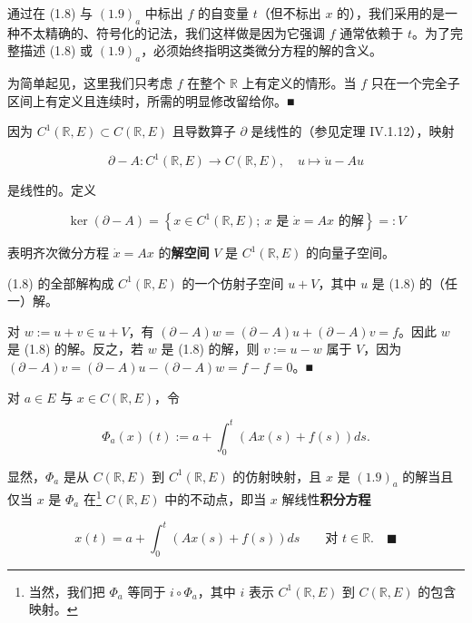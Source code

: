 \begin{remark}

\begin{items}
\item

通过在 (1.8) 与 $ (1.9)_{a} $ 中标出 $ f $ 的自变量 $ t $（但不标出 $ x $ 的），我们采用的是一种不太精确的、符号化的记法，我们这样做是因为它强调 $ f $ 通常依赖于 $ t $。为了完整描述 (1.8) 或 $ (1.9)_{a} $，必须始终指明这类微分方程的解的含义。

\item

为简单起见，这里我们只考虑 $ f $ 在整个 $ \mathbb{R} $ 上有定义的情形。当 $ f $ 只在一个完全子区间上有定义且连续时，所需的明显修改留给你。\nobreak\hspace{0.35em}■

\item

因为 $ C^{1}(\mathbb{R}, E) \subset C(\mathbb{R}, E) $ 且导数算子 $ \partial $ 是线性的（参见定理 IV.1.12），映射

\[
\partial - A : C^{1}(\mathbb{R}, E) \to C(\mathbb{R}, E) , \quad u \mapsto \dot{u} - Au
\]

是线性的。定义

\[
\ker(\partial - A) = \left\{ x \in C^{1}(\mathbb{R}, E) ;\ x \text{ 是 } \dot{x} = Ax \text{ 的解} \right\} =: V
\]

表明齐次微分方程 $ \dot{x} = Ax $ 的\textbf{解空间} $ V $ 是 $ C^{1}(\mathbb{R}, E) $ 的向量子空间。

\item

(1.8) 的全部解构成 $ C^{1}(\mathbb{R}, E) $ 的一个仿射子空间 $ u + V $，其中 $ u $ 是 (1.8) 的（任一）解。

\proofhead
对 $ w := u + v \in u + V $，有 $ (\partial - A)w = (\partial - A)u + (\partial - A)v = f $。因此 $ w $ 是 (1.8) 的解。反之，若 $ w $ 是 (1.8) 的解，则 $ v := u - w $ 属于 $ V $，因为 $ (\partial - A)v = (\partial - A)u - (\partial - A)w = f - f = 0 $。\nobreak\hspace{0.35em}■
\item

对 $ a \in E $ 与 $ x \in C(\mathbb{R}, E) $，令

\[
\Phi_{a}(x)(t) := a + \int_{0}^{t} \left( Ax(s) + f(s) \right)ds .
\]

显然，$ \Phi_{a} $ 是从 $ C(\mathbb{R}, E) $ 到 $ C^{1}(\mathbb{R}, E) $ 的仿射映射，且 $ x $ 是 $ (1.9)_{a} $ 的解当且仅当 $ x $ 是 $ \Phi_{a} $ 在\footnote{当然，我们把 $ \Phi_{a} $ 等同于 $ i \circ \Phi_{a} $，其中 $ i $ 表示 $ C^{1}(\mathbb{R}, E) $ 到 $ C(\mathbb{R}, E) $ 的包含映射。} $ C(\mathbb{R}, E) $ 中的不动点，即当 $ x $ 解线性\textbf{积分方程}

\[
x(t) = a + \int_{0}^{t} \left( Ax(s) + f(s) \right)ds \qquad \text{对 } t \in \mathbb{R} .\quad\blacksquare
\]
\end{items}

\end{remark}

